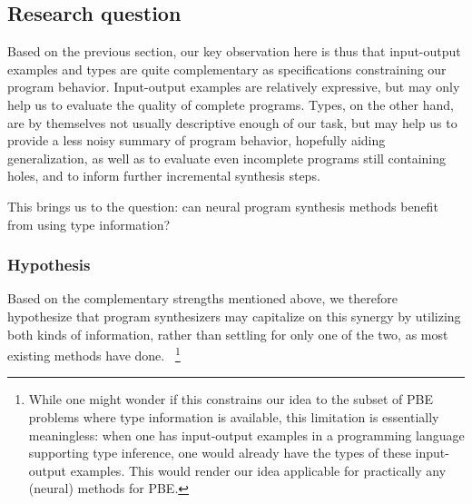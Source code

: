 \documentclass{article}
\begin{document}
\subsection{Research question}


Based on the previous section,
our key observation here is thus that input-output examples and types are
quite complementary as specifications constraining our program behavior.
Input-output examples are relatively expressive,
but may only help us to evaluate the quality of complete programs.
Types, on the other hand, are by themselves not usually descriptive enough of our task,
but may help us to provide a less noisy summary of program behavior, hopefully aiding generalization,
as well as to evaluate even incomplete programs still containing holes,
and to inform further incremental synthesis steps.

This brings us to the question:
        can neural program synthesis methods benefit from using type information?

\subsubsection{Hypothesis}

Based on the complementary strengths mentioned above,
we therefore hypothesize that program synthesizers may capitalize on this synergy by utilizing both kinds of information,
rather than settling for only one of the two, as most existing methods have done.%
~\footnote{
    While one might wonder if this constrains our idea to the subset of PBE problems where type information is available,
    this limitation is essentially meaningless:
    when one has input-output examples in a programming language supporting type inference,
    one would already have the types of these input-output examples.
    This would render our idea applicable for practically any (neural) methods for PBE.
}%
\end{document}
